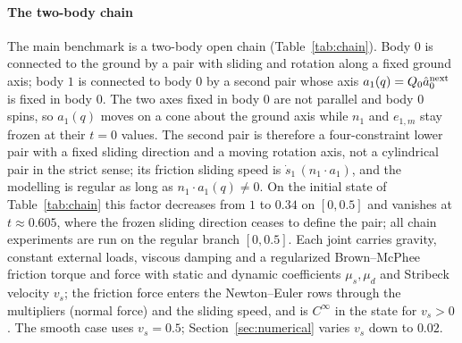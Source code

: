 \documentclass[preprint,12pt]{elsarticle}
\begin{document}
\paragraph{The two-body chain}
The main benchmark is a two-body open chain (Table~\ref{tab:chain}). Body $0$ is connected to the
ground by a pair with sliding and rotation along a fixed ground axis; body $1$ is connected to body
$0$ by a second pair whose axis $a_1(q)=Q_0\hat a^{\rm next}_0$ is fixed in body $0$. The two axes
fixed in body $0$ are not parallel and body $0$ spins, so $a_1(q)$ moves on a cone about the ground
axis while $n_1$ and $e_{1,m}$ stay frozen at their $t=0$ values. The second pair is therefore a
four-constraint lower pair with a fixed sliding direction and a moving rotation axis, not a
cylindrical pair in the strict sense; its friction sliding speed is $\dot s_1\,(n_1\cdot a_1)$, and
the modelling is regular as long as $n_1\cdot a_1(q)\neq0$. On the initial state of
Table~\ref{tab:chain} this factor decreases from $1$ to $0.34$ on $[0,0.5]$ and vanishes at
$t\approx0.605$, where the frozen sliding direction ceases to define the pair; all chain
experiments are run on the regular branch $[0,0.5]$. Each joint carries gravity, constant external
loads, viscous damping and a regularized Brown--McPhee friction torque and force
\cite{browmcphee2016friction} with static and dynamic coefficients $\mu_s,\mu_d$ and Stribeck
velocity $v_s$; the friction force enters the Newton--Euler rows through the multipliers (normal
force) and the sliding speed, and is $C^\infty$ in the state for $v_s>0$. The smooth case uses
$v_s=0.5$; Section~\ref{sec:numerical} varies $v_s$ down to $0.02$.
\end{document}
